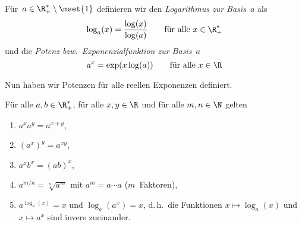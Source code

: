 \documentclass[a4paper]{article}
\begin{document}
\begin{definition}
    Für~$a \in \R_+^*\setminus\mset{1}$ definieren wir den \emph{Logarithmus zur Basis~$a$} als
    \begin{equation*}
        \log_a(x) = \frac{\log(x)}{\log(a)} \qquad\text{für alle } x \in \R_+^*
    \end{equation*}
    und die \emph{Potenz bzw.\ Exponenzialfunktion zur Basis~$a$}
    \begin{equation*}
        a^x = \exp(x\log(a)) \qquad\text{für alle } x \in \R
    \end{equation*}
\end{definition}

Nun haben wir Potenzen für alle reellen Exponenzen definiert.

\begin{theorem}[Potenzgesetze]
    Für alle $a,b \in \R_+^*$, für alle $x,y \in \R$ und für alle $m,n \in \N$ gelten
    \begin{enumerate}
        \item $a^xa^y = a^{x+y}$,\label{thm:powerlaws:1}
        \item $(a^x)^y = a^{xy}$,\label{thm:powerlaws:2}
        \item $a^xb^x = (ab)^x$,
        \item $a^{m/n} = \sqrt[n]{a^m}$ mit $a^m = a\cdots a$ ($m$~Faktoren),
        \item $a^{\log_a(x)} = x$ und $\log_a(a^x) = x$, d.\,h.\ die Funktionen $x \mapsto \log_a(x)$ und $x \mapsto a^x$ sind invers zueinander.
    \end{enumerate}
\end{theorem}
\end{document}
